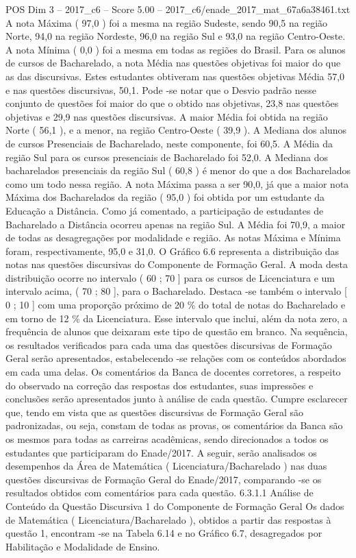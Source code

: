 \begin{textsample}{POS Dim 3 – 2017\_c6 – Score 5.00 – 2017\_c6/enade\_2017\_mat\_67a6a38461.txt}
A nota Máxima ( 97,0 ) foi a mesma na região Sudeste, sendo 90,5 na região Norte, 94,0 na região Nordeste, 96,0 na região Sul e 93,0 na região Centro-Oeste.
A nota Mínima ( 0,0 ) foi a mesma em todas as regiões do Brasil.
Para os alunos de cursos de Bacharelado, a nota Média nas questões objetivas foi maior do que as das discursivas.
Estes estudantes obtiveram nas questões objetivas Média 57,0 e nas questões discursivas, 50,1.
Pode -se notar que o Desvio padrão nesse conjunto de questões foi maior do que o obtido nas objetivas, 23,8 nas questões objetivas e 29,9 nas questões discursivas.
A maior Média foi obtida na região Norte ( 56,1 ), e a menor, na região Centro-Oeste ( 39,9 ).
A Mediana dos alunos de cursos Presenciais de Bacharelado, neste componente, foi 60,5.
A Média da região Sul para os cursos presenciais de Bacharelado foi 52,0.
A Mediana dos bacharelados presenciais da região Sul ( 60,8 ) é menor do que a dos Bacharelados como um todo nessa região.
A nota Máxima passa a ser 90,0, já que a maior nota Máxima dos Bacharelados da região ( 95,0 ) foi obtida por um estudante da Educação a Distância.
Como já comentado, a participação de estudantes de Bacharelado a Distância ocorreu apenas na região Sul.
A Média foi 70,9, a maior de todas as desagregações por modalidade e região.
As notas Máxima e Mínima foram, respectivamente, 95,0 e 31,0.
O Gráfico 6.6 representa a distribuição das notas nas questões discursivas do Componente de Formação Geral.
A moda desta distribuição ocorre no intervalo ( 60 ; 70 ] para os cursos de Licenciatura e um intervalo acima, ( 70 ; 80 ], para o Bacharelado.
Destaca -se também o intervalo [ 0 ; 10 ] com uma proporção próximo de 20 \% do total de notas do Bacharelado e em torno de 12 \% da Licenciatura.
Esse intervalo que inclui, além da nota zero, a frequência de alunos que deixaram este tipo de questão em branco.
Na sequência, os resultados verificados para cada uma das questões discursivas de Formação Geral serão apresentados, estabelecendo -se relações com os conteúdos abordados em cada uma delas.
Os comentários da Banca de docentes corretores, a respeito do observado na correção das respostas dos estudantes, suas impressões e conclusões serão apresentados junto à análise de cada questão.
Cumpre esclarecer que, tendo em vista que as questões discursivas de Formação Geral são padronizadas, ou seja, constam de todas as provas, os comentários da Banca são os mesmos para todas as carreiras acadêmicas, sendo direcionados a todos os estudantes que participaram do Enade/2017.
A seguir, serão analisados os desempenhos da Área de Matemática ( Licenciatura/Bacharelado ) nas duas questões discursivas de Formação Geral do Enade/2017, comparando -se os resultados obtidos com comentários para cada questão. 6.3.1.1 Análise de Conteúdo da Questão Discursiva 1 do Componente de Formação Geral Os dados de Matemática ( Licenciatura/Bacharelado ), obtidos a partir das respostas à questão 1, encontram -se na Tabela 6.14 e no Gráfico 6.7, desagregados por Habilitação e Modalidade de Ensino.

\end{textsample}
